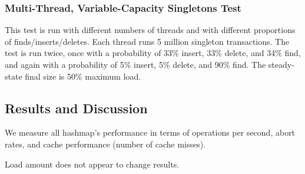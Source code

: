\subsubsection{Multi-Thread, Variable-Capacity Singletons Test} 
This test is run with different numbers of threads and with different proportions of finds/inserts/deletes. Each thread runs 5 million singleton transactions.
The test is run twice, once with a probability of 33\% insert, 33\% delete, and 34\% find, and again with a probability of 5\% insert, 5\% delete, and 90\% find. The steady-state final size is 50\% maximum load.

\subsection{Results and Discussion}

We measure all hashmap's performance in terms of operations per second, abort rates, and cache performance (number of cache misses). 

Load amount does not appear to change results.

